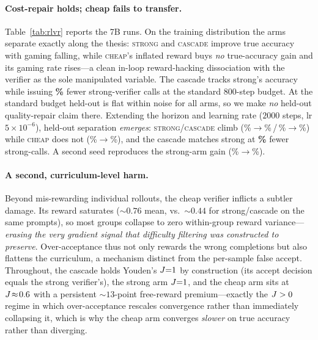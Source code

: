 \paragraph{Cost-repair holds; cheap fails to transfer.} Table~\ref{tab:rlvr} reports the 7B runs. On the
training distribution the arms separate exactly along the thesis: \textsc{strong} and \textsc{cascade} improve
true accuracy with gaming falling, while \textsc{cheap}'s inflated reward buys \emph{no} true-accuracy gain
and its gaming rate rises---a clean in-loop reward-hacking dissociation with the verifier as the sole
manipulated variable. The cascade tracks strong's accuracy while issuing \textbf{\mSevenBSavings\%} fewer
strong-verifier calls at the standard $800$-step budget. At the standard budget held-out is flat within noise
for all arms, so we make \emph{no} held-out quality-repair claim there. Extending the horizon and learning
rate ($2000$ steps, lr $5{\times}10^{-6}$), held-out separation \emph{emerges}: \textsc{strong}/\textsc{cascade}
climb (\longStrongHoBase\%$\to$\longStrongHoFinal\%\,/\,\longCascadeHoBase\%$\to$\longCascadeHoFinal\%) while
\textsc{cheap} does not (\longCheapHoBase\%$\to$\longCheapHoFinal\%), and the cascade matches strong at
\textbf{\longSavings\%} fewer strong-calls. A second seed reproduces the strong-arm gain
(\longStrongBHoBase\%$\to$\longStrongBHoFinal\%).

\paragraph{A second, curriculum-level harm.} Beyond mis-rewarding individual rollouts, the cheap verifier
inflicts a subtler damage. Its reward saturates ($\sim\!0.76$ mean, vs.\ $\sim\!0.44$ for strong/cascade on
the same prompts), so most groups collapse to zero within-group reward variance---\emph{erasing the very
gradient signal that difficulty filtering was constructed to preserve}. Over-acceptance thus not only rewards
the wrong completions but also flattens the curriculum, a mechanism distinct from the per-sample false accept.
Throughout, the cascade holds Youden's $J{=}1$ by construction (its accept decision equals the strong
verifier's), the strong arm $J{=}1$, and the cheap arm sits at $J\!\approx\!0.6$ with a persistent
$\sim\!13$-point free-reward premium---exactly the $J>0$ regime in which over-acceptance rescales
convergence rather than immediately collapsing it, which is why the cheap arm converges \emph{slower} on true
accuracy rather than diverging.

